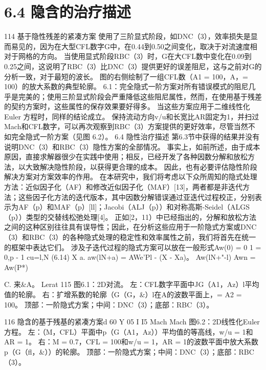 \documentclass[UTF8,11pt,a4paper,openany,fontset=fandol]{ctexbook}
\begin{document}
\section{6.4 隐含的治疗描述}
114 基于隐性残差的紧凑方案 使用了三阶显式阶段，如DNC（3），效率损失是显而易见的，因为在大型CFL数字G中，在0.44到0.50之间变化，取决于对流速度相对于网格的方向。 当使用显式阶段RBC（3）时，G在大CFL数中变化在0.09到0.25之间，这说明了RBC（3）比DNC（3）提供更好的误差阻尼，这与之前对G的分析一致，对于最短的波长。 图的右侧绘制了一组CFL数（A1 = 100，A，= 100）的放大系数的典型轮廓。 6.1：完全隐式一阶方案对所有错误模式的阻尼几乎是完美的；使用三阶显式阶段会严重降低这些阻尼属性，然而，在使用基于残差的契约方案时，这些属性的保存效果要好得多。 当这些方案应用于二维线性化Euler 方程时，同样的结论成立。 保持流动方向v/u和长宽比AR固定为1，并扫过Mach和CFL数字，可以再次观察到RBC（3）方案提供的更好效率，尽管当然不如完全隐式一阶方案（见图 6.2）。 6.4 隐性治疗描述 第6.3节中获得的结果并没有说明DNC（3）和RBC（3）隐性方案的全部情况。 事实上，如前所述，由于成本原因，直接求解器很少在实践中使用；相反，已经开发了各种因数分解和放松方法，以大致解决隐性阶段，以获得更合理的成本。 因此，也有必要评估隐性阶段解决方案对方案效率的作用。 在本研究中，我们将考虑以下众所周知的隐式处理方法：近似因子化（AF）和修改近似因子化（MAF）[13]，两者都是非迭代方法；这些因子化方法的迭代版本，其中因数分解错误通过亚迭代过程校正，分别表示为AF（p）和MAF（p）[ll]；Jacobi（ALJ（p））和对称高斯-Seidel（ALGS（p））类型的交替线松弛处理[4]。 正如[2，11）中已经指出的，分解和放松方法之间的这种区别往往具有误导性；因此，在分析这些应用于一阶隐式方案或DNC（3）和RBC（3）的各种隐式处理的稳定性和效率属性之前，我们将首先在统一的框架中表达它们。 涉及子迭代过程的隐式方案可以放在一般形式Aw(0) = 0 1 = 0,p - 1 cu=l,N (6.14) X a. aw(lN+a) = AWe'Pl - (X - Xa)。 Aw(lN+"-l) Awn = Aw(P*)

C. 来\&A。 Lerat 115 图6.1：2D对流。 左：CFL数字平面中JG（A1，Az）l平均值的轮廓。 右：扩增系数的轮廓（G（G，\&）l在A的波数平面上，= A2 = 100。 顶部：一阶隐式方案；中间：DNC（3）；底部：RBC（3）。

116 隐含的基于残基的紧凑方案d 60 Y 05 I I5 Mach Mach 图6.2：2D线性化Euler 方程。 左：（M，CFL）平面中p（G（A1，Az））平均值的等高线，w/u = 1和AR = 1。 右：M = 0.7，CFL = 100和w/u = 1，AR = 1的波数平面中放大系数p（G（fl，\&））的轮廓。 顶部：一阶隐式方案；中间：DNC（3）；底部：RBC（3）。
\end{document}
